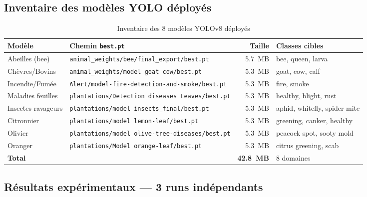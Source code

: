 \subsection*{Inventaire des modèles YOLO déployés}

\begin{table}[H]
\caption{Inventaire des 8 modèles YOLOv8 déployés}
\label{tab:yolo_models}
\centering
\small
\begin{tabularx}{\textwidth}{@{}l X r l@{}}
\toprule
\textbf{Modèle} & \textbf{Chemin \texttt{best.pt}} & \textbf{Taille} & \textbf{Classes cibles} \\
\midrule
Abeilles (bee)       & \texttt{animal\_weights/bee/final\_export/best.pt}              & 5.7~MB & bee, queen, larva \\
Chèvres/Bovins       & \texttt{animal\_weights/model goat cow/best.pt}                & 5.3~MB & goat, cow, calf \\
Incendie/Fumée       & \texttt{Alert/model-fire-detection-and-smoke/best.pt}          & 5.3~MB & fire, smoke \\
Maladies feuilles    & \texttt{plantations/Detection diseases Leaves/best.pt}         & 5.3~MB & healthy, blight, rust \\
Insectes ravageurs   & \texttt{plantations/model insects\_final/best.pt}              & 5.3~MB & aphid, whitefly, spider mite \\
Citronnier           & \texttt{plantations/model lemon-leaf/best.pt}                  & 5.3~MB & greening, canker, healthy \\
Olivier              & \texttt{plantations/model olive-tree-diseases/best.pt}         & 5.3~MB & peacock spot, sooty mold \\
Oranger              & \texttt{plantations/Model orange-leaf/best.pt}                 & 5.3~MB & citrus greening, scab \\
\midrule
\multicolumn{2}{l}{\textbf{Total}} & \textbf{42.8~MB} & 8 domaines \\
\bottomrule
\end{tabularx}
\end{table}

\subsection{Résultats expérimentaux — 3 runs indépendants}

